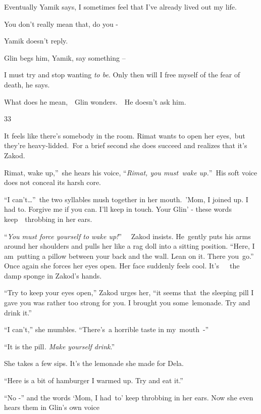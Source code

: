 \documentclass[letterpaper]{article}
\begin{document}
Eventually Yamik says, {\textquotedbl}I sometimes feel that I've already lived out my life.{\textquotedbl} 

{\textquotedbl}You don't really mean that, do you -{\textquotedbl}

Yamik doesn't reply.

Glin begs him, {\textquotedbl}Yamik, say something --{\textquotedbl} 

{\textquotedbl}I must try and stop wanting \textit{to be}. Only then will I free myself of the fear of
death,{\textquotedbl} he says. 

What does he mean,\ \ Glin wonders.\ \ He doesn't ask him.


\bigskip

33 

It feels like there{}'s somebody in the room. Rimat wants to open her eyes,\ but they're heavy-lidded.\ For a brief
second she does succeed and realizes that it{}'s Zakod.\ 

{\textquotedbl}Rimat, wake up,''\ she hears his voice, ``\textit{Rimat, you must\ wake up.}{}''\textit{\ }His soft voice
does not conceal its harsh core. 

{}``I can{}'t{\dots}''\  the two syllables mush together in her mouth.\ {}'Mom, I joined up. I had to. Forgive me if you
can. I{}'ll keep in touch. Your Glin{}' - these  words  keep\ \ throbbing  in her ears.

{}``\textit{You must force yourself to wake up!}{}'' \textit{\ }\ Zakod insists. He\ gently puts his arms around her
shoulders and pulls her like a rag doll into a sitting position. ``Here, I am\ putting a pillow between your back and
the wall. Lean on it. There you\ go.{}'' Once again she forces her eyes open. Her face suddenly feels cool.
It{}'s\ \ \ the damp sponge in Zakod{}'s hands. 

{}``Try to keep your eyes open,'' Zakod urges her, ``it seems that\ the sleeping pill I gave you was rather too strong
for you. I brought you some\ lemonade. Try and drink it.''

{}``I can{}'t,{}'' she mumbles. ``There{}'s\ a horrible taste in my\ mouth\ {}-''\ 

{}``It is the pill\textit{. Make yourself drink}.{}''\ 

She takes a few sips. It's the lemonade she made for Dela.

{}``Here is a bit of hamburger I warmed up. Try and eat it.{}''

{}``No -{}'' and the words `Mom, I had\ to' keep throbbing in her ears. Now she even hears them in Glin's own voice
\end{document}
